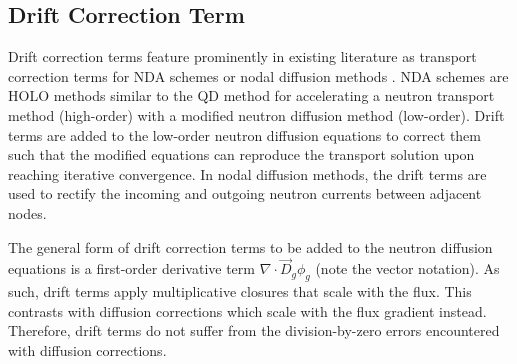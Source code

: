 \subsection{Drift Correction Term} \label{sec:drift-correction}

Drift correction terms feature prominently in existing literature as transport correction
terms for \gls{NDA} schemes or nodal diffusion methods
\cite{smith_nodal_1983, smith_assembly_1986, adams_fast_2002, wang_diffusion_2014}. \gls{NDA}
schemes are \gls{HOLO} methods \cite{chacon_multiscale_2017} similar to the \gls{QD} method for
accelerating a neutron transport
method (high-order) with a modified neutron diffusion method (low-order). Drift terms
are added to the low-order neutron diffusion equations to correct them such that the modified
equations can reproduce the transport solution upon reaching iterative convergence. In nodal
diffusion methods, the drift terms are used to rectify the incoming and outgoing neutron
currents between adjacent nodes.

The general form of drift correction terms to be added to the neutron diffusion equations is a
first-order derivative term $\nabla\cdot \vec{D}_g\phi_g$ (note the vector notation). As such,
drift terms apply
multiplicative closures that scale with the flux. This contrasts with diffusion
corrections which scale with the flux gradient instead. Therefore, drift terms do not suffer from
the division-by-zero errors encountered with diffusion corrections.

